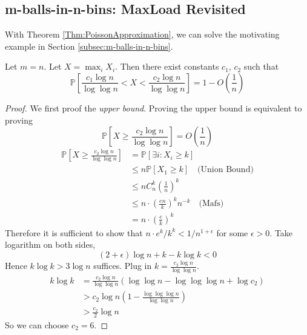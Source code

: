     \subsection{m-balls-in-n-bins: MaxLoad Revisited}
        With Theorem \ref{Thm:PoissonApproximation}, we can solve the motivating example in Section \ref{subsec:m-balls-in-n-bins}.
        \begin{theorem}
            Let $m=n$. Let $X = \max_i X_i$. Then there exist constants $c_1$, $c_2$ such that
            \[ \mathbb{P}\left[\frac{c_1\log n}{\log\log n} < X < \frac{c_2\log n}{\log\log n}\right] = 1 - O\left(\frac{1}{n}\right) \]
        \end{theorem}
        \begin{proof}
            We first proof the \emph{upper bound}. Proving the upper bound is equivalent to proving
            \[\mathbb{P}\left[ X \ge \frac{c_2\log n}{\log\log n} \right] = O\left(\frac{1}{n}\right) \]
            \begin{align*}
                \mathbb{P}\left[ X \ge \frac{c_2\log n}{\log\log n} \right] &= \mathbb{P}[\exists i: X_i \ge k]\\
                &\le n\mathbb{P}[X_1 \ge k] \quad \text{(Union Bound)}\\
                &\le n C^k_n\left(\frac{1}{n}\right)^k\\
                &\le n\cdot \left(\frac{en}{k}\right)^k n^{-k} \quad \text{(Mafs)}\\
                &= n\cdot\left(\frac{e}{k}\right)^k
            \end{align*}
            Therefore it is sufficient to show that $n\cdot e^k / k^k < 1/n^{1+\epsilon}$ for some $\epsilon > 0$. Take logarithm on both sides,
            \[ (2+\epsilon)\log n + k - k\log k < 0 \]
            Hence $k\log k > 3\log n$ suffices. Plug in $k = \frac{c_2\log n}{\log\log n}$.
            \begin{align*}
                k\log k &= \frac{c_2\log n}{\log\log n} (\log\log n - \log\log\log n + \log c_2)\\
                &> c_2\log n\left(1- \frac{\log\log\log n}{\log\log n}\right)\\
                &> \frac{c_2}{2}\log n
            \end{align*}
            So we can choose $c_2 = 6$.
            

\end{proof}
